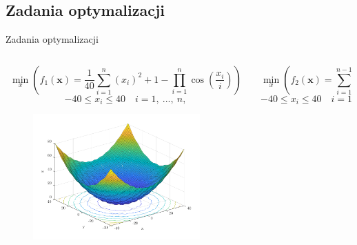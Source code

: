 \documentclass[handout]{beamer}
\newcommand{\vect}[1]{\bm{\mathbf{#1}}}
\begin{document}
\subsection{Zadania optymalizacji}
\begin{frame}{Zadania optymalizacji}

\vspace{-.7cm}
\begin{columns}
\begin{column}[t]{0.5\textwidth}

\begin{tiny}
\begin{equation}
\min_{x} \left(f_{1}\left(\vect{x}\right) = \frac{1}{40} \sum_{i=1}^{n}\left(x_{i}\right)^{2} + 1 - \prod_{i =1}^{n} \cos\left(\frac{x_{i}}{i}\right)\right)
\end{equation}
\begin{equation}
-40 \leq x_{i} \leq 40 \quad i = 1, \ ..., \ n,
\end{equation}
\end{tiny}


\vspace{-.3cm}

\begin{figure}[t]
\includegraphics[width=0.9\textwidth]{grafiki/zad_1.pdf}
\end{figure}

\end{column}
\begin{column}[t]{0.5\textwidth}

\begin{tiny}
\begin{equation}
\min_{x} \left(f_{2}\left(\vect{x}\right) = \sum_{i=1}^{n-1}\left(100\left(x_{i+1}-x_{i}^{2}\right)^{2} + \left(1-x_{i}\right)^{2} \right) \right)
\end{equation}
\begin{equation}
-40 \leq x_{i} \leq 40 \quad i = 1, \ ..., \ n,
\end{equation}
\end{tiny}


\end{column}
\end{columns}
\end{frame}
\end{document}
